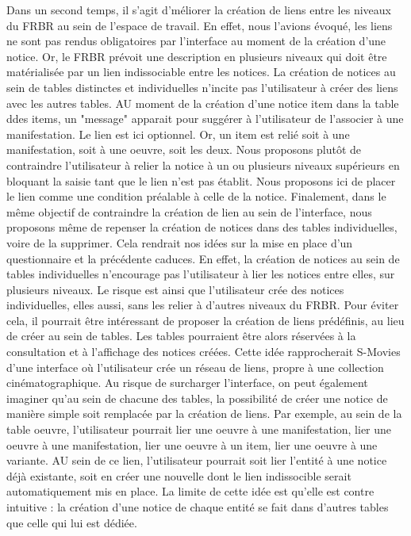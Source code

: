 Dans un second temps, il s'agit d'méliorer la création de liens entre les niveaux du FRBR au sein de l'espace de travail. En effet, nous l'avions évoqué, les liens ne sont pas rendus obligatoires par l'interface au moment de la création d'une notice. Or, le FRBR prévoit une description en plusieurs niveaux qui doit être matérialisée par un lien indissociable entre les notices. La création de notices au sein de tables distinctes et individuelles n'incite pas l'utilisateur à créer des liens avec les autres tables. AU moment de la création d'une notice item dans la table ddes items, un "message" apparait pour suggérer à l'utilisateur de l'associer à une manifestation. Le lien est ici optionnel. Or, un item est relié soit à une manifestation, soit à une oeuvre, soit les deux. Nous proposons plutôt de contraindre l'utilisateur à relier la notice à un ou plusieurs niveaux supérieurs en bloquant la saisie tant que le lien n'est pas établit. Nous proposons ici de placer le lien comme une condition préalable à celle de la notice. 
Finalement, dans le même objectif de contraindre la création de lien au sein de l'interface, nous proposons même de repenser la création de notices dans des tables individuelles, voire de la supprimer. Cela rendrait nos idées sur la mise en place d'un questionnaire et la précédente caduces. 
En effet, la création de notices au sein de tables individuelles n’encourage pas l’utilisateur à lier les notices entre elles, sur plusieurs niveaux. Le risque est ainsi que l’utilisateur crée des notices individuelles, elles aussi, sans les relier à d’autres niveaux du FRBR. Pour éviter cela, il pourrait être intéressant de proposer la création de liens prédéfinis, au lieu de créer au sein de tables. Les tables pourraient être alors réservées à la consultation et à l’affichage des notices créées. Cette idée rapprocherait S-Movies d’une interface où l’utilisateur crée un réseau de liens, propre à une collection cinématographique.
Au risque de surcharger l’interface, on peut également imaginer qu’au sein de chacune des tables, la possibilité de créer une notice de manière simple soit remplacée par la création de liens. Par exemple, au sein de la table oeuvre, l'utilisateur pourrait lier une oeuvre à une manifestation, lier une oeuvre à une manifestation, lier une oeuvre à un item, lier une oeuvre à une variante. AU sein de ce lien, l'utilisateur pourrait soit lier l'entité à une notice déjà existante, soit en créer une nouvelle dont le lien indissocible serait automatiquement mis en place. 
La limite de cette idée est qu’elle est contre intuitive : la création d’une notice de chaque entité se fait dans d’autres tables que celle qui lui est dédiée. 
